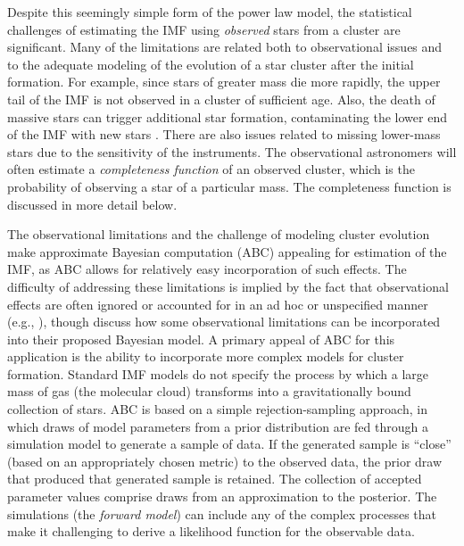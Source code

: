 \documentclass[ejs]{imsart}
\numberwithin{equation}{section}
\theoremstyle{plain}
\begin{document}
Despite this seemingly simple form of the power law model, the statistical challenges of estimating the 
IMF using \emph{observed} stars from a cluster are significant. Many of the limitations are related 
both to 
observational issues and to the adequate modeling of the evolution of a star cluster after the 
initial formation. For example, since stars of greater mass die more rapidly, the upper tail of the IMF is 
not observed in a cluster of sufficient age.  
Also, the death of massive stars can trigger additional star formation,
contaminating the lower end of the IMF with new stars \citep{Woosley2015}.
There are also issues related to missing lower-mass stars due to the sensitivity of the instruments.  
The observational astronomers will often estimate a \emph{completeness function} of an observed 
cluster, which is the probability of observing a star of a particular mass.  The completeness 
function is discussed in more detail below.

The observational limitations and the challenge of modeling cluster evolution make approximate Bayesian 
computation (ABC) appealing for estimation of the IMF, as ABC allows for relatively easy incorporation of
such effects. The difficulty of addressing these limitations is 
implied by the fact that observational effects are often ignored or accounted for in 
an ad hoc or unspecified manner (e.g., \citealt{DaRioEtAl2012, Ashworth2017, Jose2017, Kalari2018}), 
though \cite{weisz13} discuss how some observational limitations can be incorporated into their 
proposed Bayesian model.
A primary appeal of ABC for this application is the ability to incorporate more complex models for cluster
formation. 
Standard IMF models do not specify the process by which
a large mass of gas (the molecular cloud) transforms into a gravitationally bound collection of stars. 
ABC is based on a simple rejection-sampling approach, in which draws of model parameters from a prior 
distribution are fed through a simulation model to generate a sample of data. 
If the generated sample is ``close'' (based on an appropriately chosen metric) to the 
observed data, the prior draw that produced that generated sample is retained. The collection of
accepted parameter values comprise draws from an approximation to the posterior.
The simulations
(the \emph{forward model}) can include any of the complex processes that make it challenging to derive a
likelihood function for the observable data.
\end{document}
